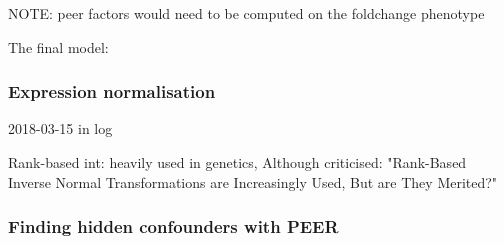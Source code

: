     NOTE: peer factors would need to be computed on the foldchange phenotype

The final model:

\subsubsection{Expression normalisation}

2018-03-15 in log

Rank-based int:
heavily used in genetics, 
    Although criticised: "Rank-Based Inverse Normal Transformations are Increasingly Used, But are They Merited?"

\subsubsection{Finding hidden confounders with PEER}

